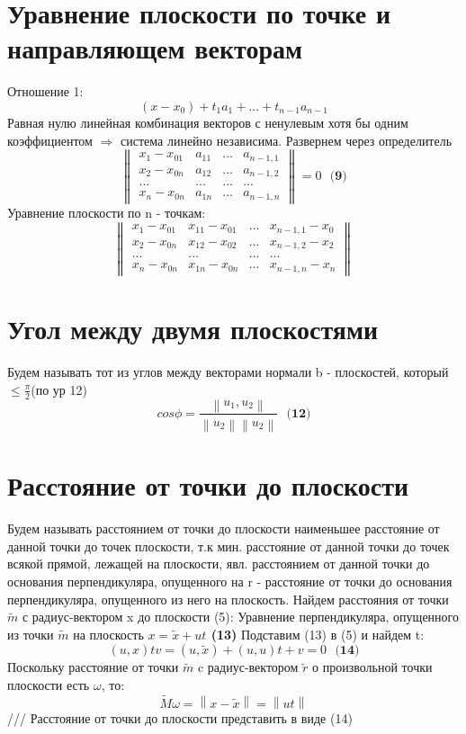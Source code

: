 \documentclass{article}
\begin{document}
\section{Уравнение плоскости по точке и направляющем векторам}
Отношение 1:
\[(x-x_0) + t_1a_1 + ... + t_{n-1}a_{n-1}\]
Равная нулю линейная комбинация векторов с ненулевым хотя бы одним коэффициентом \(\Rightarrow \) система линейно независима. \newline
Развернем через определитель
\[\begin{Vmatrix}
x_1 - x_{01} & a_{11} & ... & a_{n-1,1}\\ 
x_2 - x_{0n} & a_{12} & ... & a_{n-1,2}\\ 
... & ... &  ...&  ...\\ 
x_n - x_{0n} & a_{1n} & ... & a_{n-1,n}
\end{Vmatrix} = 0 \text{  }\textbf{(9)}\]
Уравнение плоскости по n - точкам:
\[\begin{Vmatrix}
x_1 - x_{01} & x_{11} - x_{01} & ... & x_{n-1,1} - x_0\\ 
x_2 - x_{0n} & x_{12} - x_{02} & ... & x_{n-1,2} - x_2\\ 
... & ... &  ...&  ...\\ 
x_n - x_{0n} & x_{1n} - x_{0n} & ... & x_{n-1,n} - x_n
\end{Vmatrix}\]
\section{Угол между двумя плоскостями}
Будем называть тот из углов между векторами нормали b - плоскостей, который \(\leq \frac{\pi}{2}\)(по ур 12)\newline
\[cos\phi = \frac{\left \| u_1,u_2 \right \|}{\left \| u_2 \right \|\left \| u_2 \right \|}\text{  } \textbf{(12)}\]
\section{Расстояние от точки до плоскости}
Будем называть расстоянием от точки до плоскости наименьшее расстояние от данной точки до точек плоскости, т.к мин. расстояние от данной точки до точек всякой прямой, лежащей на плоскости, явл. расстоянием от данной точки до основания перпендикуляра, опущенного на r - расстояние от точки до основания перпендикуляра, опущенного из него на плоскость. \newline
Найдем расстояния от точки \(\tilde{m}\) с радиус-вектором x до плоскости (5):\newline
Уравнение перпендикуляра, опущенного из точки \(\tilde{m}\) на плоскость \textbf{\(x = \tilde{x} + ut\) (13) }
\newline
Подставим (13) в (5) и найдем t:\newline
\[(u, x)tv = (u, \tilde{x}) + (u, u)t + v = 0 \text{  } \textbf{(14)}\]
Поскольку расстояние от точки \(\tilde{m}\) c радиус-вектором \(\tilde{r}\) о произвольной точки плоскости есть \(\omega\), то:
\[\tilde{M}\omega = \left \| x - \tilde{x} \right \| = \left \| ut
 \right \|\]
 /// Расстояние от точки до плоскости представить в виде (14)

 
\end{document}
